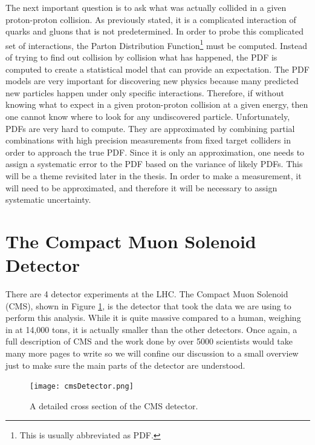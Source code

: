 The next important question is to ask what was actually collided in a given proton-proton collision.
As previously stated, it is a complicated interaction of quarks and gluons that is not predetermined.
In order to probe this complicated set of interactions, the Parton Distribution Function\footnote{This is usually abbreviated as PDF.} must be computed. 
Instead of trying to find out collision by collision what has happened, the PDF is computed to create a statistical model that can provide an expectation.
The PDF models are very important for discovering new physics because many predicted new particles happen under only specific interactions.
Therefore, if without knowing what to expect in a given proton-proton collision at a given energy, then one cannot know where to look for any undiscovered particle.
Unfortunately, PDFs are very hard to compute. They are approximated by combining partial combinations with high precision measurements from fixed target colliders in order to approach the true PDF.
Since it is only an approximation, one needs to assign a systematic error to the PDF based on the variance of likely PDFs. 
This will be a theme revisited later in the thesis. In order to make a measurement, it will need to be approximated, and therefore it will be necessary to assign systematic uncertainty.

\section{The Compact Muon Solenoid Detector}
There are 4 detector experiments at the LHC. The Compact Muon Solenoid (CMS), shown in Figure \ref{fig:fig_3-3}, is the detector that took the data we are using to perform this analysis.
While it is quite massive compared to a human, weighing in at 14,000 tons, it is actually smaller than the other detectors.
Once again, a full description of CMS and the work done by over 5000 scientists would take many more pages to write so we will confine our discussion to a small overview just to make sure the main parts of the detector are understood.

\begin{figure} %
   \centering
   \texttt{[image: cmsDetector.png]}
   \caption{A detailed cross section of the CMS detector.}
   \label{fig:fig_3-3}
\end{figure}

\clearpage
